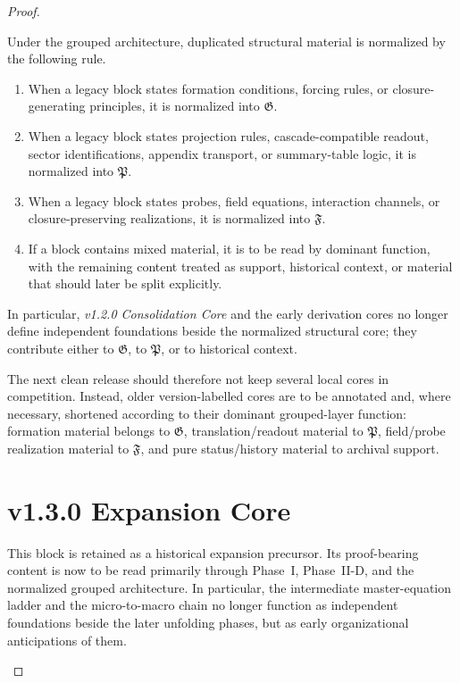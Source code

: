 \begin{proof}
\begin{proposition}
\label{prop:normalization-map-duplicated-core-material}
Under the grouped architecture, duplicated structural material is normalized by
the following rule.
\begin{enumerate}[leftmargin=2em,label=(\roman*)]
\item When a legacy block states formation conditions, forcing rules, or
closure-generating principles, it is normalized into $\mathfrak G$.
\item When a legacy block states projection rules, cascade-compatible readout,
sector identifications, appendix transport, or summary-table logic, it is
normalized into $\mathfrak P$.
\item When a legacy block states probes, field equations, interaction channels,
or closure-preserving realizations, it is normalized into $\mathfrak F$.
\item If a block contains mixed material, it is to be read by dominant function,
with the remaining content treated as support, historical context, or material
that should later be split explicitly.
\end{enumerate}
In particular, \emph{v1.2.0 Consolidation Core} and the early derivation cores no
longer define independent foundations beside the normalized structural core;
they contribute either to $\mathfrak G$, to $\mathfrak P$, or to historical
context.
\end{proposition}

\begin{remark}
\label{rem:practical-consequence-next-clean-release}
The next clean release should therefore not keep several local cores in
competition. Instead, older version-labelled cores are to be annotated and,
where necessary, shortened according to their dominant grouped-layer function:
formation material belongs to $\mathfrak G$, translation/readout material to
$\mathfrak P$, field/probe realization material to $\mathfrak F$, and pure
status/history material to archival support.
\end{remark}


\section*{v1.3.0 Expansion Core}

\begin{remark}
\label{rem:normalization-note-v130}
This block is retained as a historical expansion precursor. Its proof-bearing content is now to be read primarily through Phase~I, Phase~II-D, and the normalized grouped architecture. In particular, the intermediate master-equation ladder and the micro-to-macro chain no longer function as independent foundations beside the later unfolding phases, but as early organizational anticipations of them.
\end{remark}


\end{proof}
